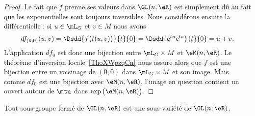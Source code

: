 \begin{proof}
    Le fait que \( f\) prenne ses valeurs dans \( \GL(n,\eR)\) est simplement dû au fait que les exponentielles sont toujours inversibles. Nous considérons ensuite la différentielle : si \( u\in \mL_G\) et \( v\in M\) nous avons
    \begin{equation}
        df_{(0,0)}(u,v)=\Dsdd{ f\big( t(u,v) \big) }{t}{0}=\Dsdd{  e^{tu} e^{tv} }{t}{0}=u+v.
    \end{equation}
    L'application \( df_0\) est donc une bijection entre \( \mL_G\times M\) et \( \eM(n,\eR)\). Le théorème d'inversion locale~\ref{ThoXWpzqCn} nous assure alors que \( f\) est une bijection entre un voisinage de \( (0,0)\) dans \( \mL_G\times M\) et son image. Mais comme \( df_0\) est une bijection avec \( \eM(n,\eR)\), l'image en question contient un ouvert autour de \( \mtu\) dans \( \exp\big( \eM(n,\eR) \big)\).
\end{proof}

\begin{theorem}         \label{ThoOBriEoe}
    Tout sous-groupe fermé de \( \GL(n,\eR)\) est une sous-variété de \( \GL(n,\eR)\).
\end{theorem}

